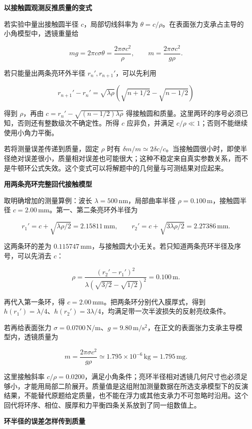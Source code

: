 \documentclass[12pt,a4paper,UTF8]{ctexart}
\begin{document}
\textbf{以接触圆观测反推质量的变式}

若实验中量出接触圆半径 \(c\)，局部切线斜率为
\(\theta=c/\rho\)。在表面张力支承占主导的小角模型中，透镜重量给

\[mg=2\pi c\sigma\theta=\frac{2\pi\sigma c^2}{\rho},\qquad m=\frac{2\pi\sigma c^2}{g\rho}.\]

若只能量出两条亮环外半径 \(r_n',r_{n+1}'\)，可以先利用

\[r_{n+1}'-r_n'=\sqrt{\lambda\rho}\left(\sqrt{n+1/2}-\sqrt{n-1/2}\right)\]

得到 \(\rho\)，再由 \(c=r_n'-\sqrt{(n-1/2)\lambda\rho}\)
得接触圆和质量。这里两环的序号必须已知，否则还有整数级次不确定性。所得
\(c\) 应非负，并满足 \(c/\rho\ll1\)；否则不能继续使用小角力平衡。

若将测量误差传递到质量，固定 \(\rho\) 时有
\(\delta m/m\simeq2\delta c/c\)。当接触圆很小时，即使半径绝对误差很小，质量相对误差也可能很大；这种不稳定来自真实参数关系，而不是牛顿环公式失效。这个变式可以将解题中的几何量与可测结果对应起来。

\textbf{用两条亮环完整回代接触模型}

取明确增加的测量算例：波长 \(\lambda=500\,\mathrm{nm}\)，局部曲率半径
\(\rho=0.100\,\mathrm m\)，接触圆半径
\(c=2.00\,\mathrm{mm}\)。第一、第二条亮环外半径为

\[r_1'=c+\sqrt{\lambda\rho/2}=2.15811\,\mathrm{mm},\qquad r_2'=c+\sqrt{3\lambda\rho/2}=2.27386\,\mathrm{mm}.\]

这两条环的差为
\(0.115747\,\mathrm{mm}\)，与接触圆大小无关。若只知道两条亮环半径及序号，可以先消去
\(c\)：

\[\rho=\frac{(r_2'-r_1')^2}{\lambda(\sqrt{3/2}-\sqrt{1/2})^2}=0.100\,\mathrm m.\]

再代入第一条环，得 \(c=2.00\,\mathrm{mm}\)。把两条环分别代入膜厚式，得到
\(h(r_1')=\lambda/4\)、\(h(r_2')=3\lambda/4\)，均满足带一次半波损失的反射亮纹条件。

若再给表面张力
\(\sigma=0.0700\,\mathrm{N/m}\)、\(g=9.80\,\mathrm{m/s^2}\)，在正文的表面张力支承主导模型内，透镜质量为

\[m=\frac{2\pi\sigma c^2}{g\rho}\simeq1.795\times10^{-6}\,\mathrm{kg}=1.795\,\mathrm{mg}.\]

这里接触斜率
\(c/\rho=0.0200\)，满足小角条件；亮环半径相对透镜几何尺寸也必须足够小，才能用局部二阶展开。质量值是这组附加测量数据在所选支承模型下的反演结果，不能替代原题给定质量，也不能在浮力或其他支承力不可忽略时沿用。这个回代将环序、相位、膜厚和力平衡四条关系放到了同一组数值上。

\textbf{环半径的误差怎样传到质量}
\end{document}

